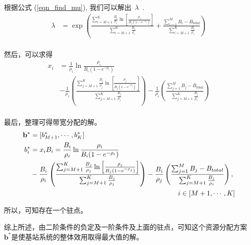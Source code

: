 根据公式 (\ref{eqn_find_mu}), 我们可以解出~$\lambda$~.
\begin{equation*}
\begin{split}
\lambda &= \exp \left( \frac{\sum_{i=M+1}^K \frac{B_i}{\rho_i} \ln \left[ \frac{\rho_i}{B_i(1-e^{-\rho_i})} \right]
}{\sum_{i=M+1}^K \frac{B_i}{\rho_i}} \right.
+ \left. \frac{ 
\sum_{i=1}^M B_i - B_{total}}{\sum_{i=M+1}^K \frac{B_i}{\rho_i}} \right)\\
\end{split}
\end{equation*}

然后，可以求得
%
\begin{equation}
\begin{split}
x_i & = \frac{1}{\rho_i} \ln \frac{\rho_i}{B_i(1-e^{-\rho_i})} \\
&-\frac{1}{\rho_i}\left( \frac{\sum_{j=M+1}^K \frac{B_j}{\rho_j} \ln \left[\frac{\rho_j}{B_j(1-e^{-\rho_j})}\right] 
}{\sum_{j=M+1}^K \frac{B_j}{\rho_j}} \right)
-\frac{1}{\rho_i}\left( \frac{ 
\sum_{j=1}^M B_j - B_{total}}{\sum_{j=M+1}^K \frac{B_j}{\rho_i}} \right) \\
\end{split}
\end{equation}
%

最后，整理可得带宽分配的解。
%
\begin{equation}
\begin{split}
\mathbf{b^*}& = [b^*_{M+1}, \cdots, b^*_{K}]\\
b_i^* & = x_iB_i = \frac{B_i}{\rho_i} \ln \frac{\rho_i}{B_i(1-e^{-\rho_i})} \\
&-\frac{B_i}{\rho_i}\left( \frac{\sum_{j=M+1}^K \frac{B_j}{\rho_j} \ln \left[\frac{\rho_j}{B_j(1-e^{-\rho_j})}\right] 
}{\sum_{j=M+1}^K \frac{B_j}{\rho_j}} \right)
 -\frac{B_i}{\rho_j}\left( \frac{ 
\sum_{j=1}^M B_j - B_{total}}{\sum_{j=M+1}^K \frac{B_j}{\rho_i}} \right),  \\ 
 & \hspace{75mm} i \in [M+1, \cdots, K] \\
\end{split}
\label{eqn:chap_cacop:b_i_bw}
\end{equation}

所以，可知存在一个驻点。

综上所述，由二阶条件的负定及一阶条件及上面的驻点，可知这个资源分配方案$\mathbf{b^*}$是使基站系统的整体效用取得最大值的解。
%
